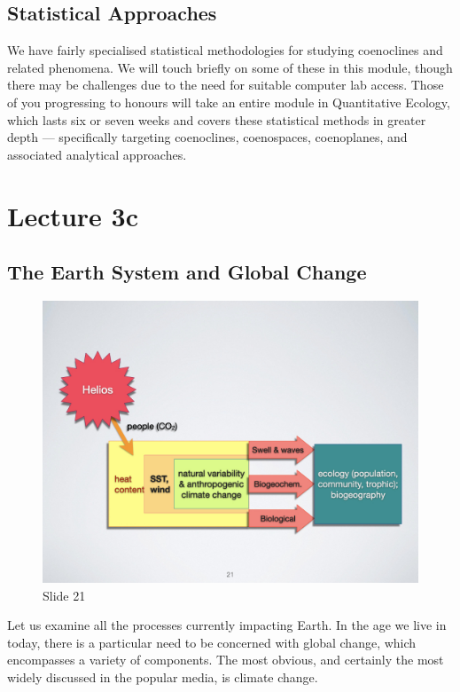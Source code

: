 \documentclass[
  10pt,
]{book}
\begin{document}
\section{Statistical Approaches}\label{statistical-approaches}

We have fairly specialised statistical methodologies for studying
coenoclines and related phenomena. We will touch briefly on some of
these in this module, though there may be challenges due to the need for
suitable computer lab access. Those of you progressing to honours will
take an entire module in Quantitative Ecology, which lasts six or seven
weeks and covers these statistical methods in greater depth ---
specifically targeting coenoclines, coenospaces, coenoplanes, and
associated analytical approaches.

\chapter*{Lecture 3c}\label{lecture-3c}

\section{The Earth System and Global
Change}\label{the-earth-system-and-global-change}

\begin{figure}[ht]
\centering
\includegraphics[width=0.8\linewidth]{../images/BDC334/BDC334-021.jpeg}
\caption*{Slide 21}
\end{figure}

Let us examine all the processes currently impacting Earth. In the age
we live in today, there is a particular need to be concerned with global
change, which encompasses a variety of components. The most obvious, and
certainly the most widely discussed in the popular media, is climate
change.
\end{document}
